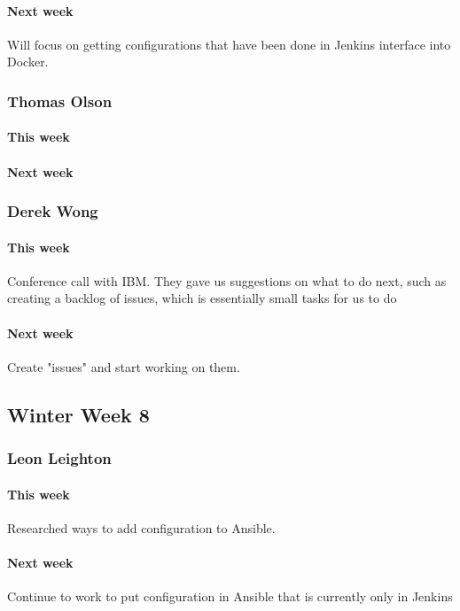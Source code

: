 \documentclass[10pt,letterpaper,onecolumn,draftclsnofoot]{IEEEtran}
\begin{document}
\paragraph{Next week}Will focus on getting configurations that have been done in Jenkins interface into Docker.


\subsubsection{Thomas Olson}
\paragraph{This week}
\paragraph{Next week}


\subsubsection{Derek Wong}
\paragraph{This week}Conference call with IBM. They gave us suggestions on what to do next, such as creating a backlog of issues, which is essentially small tasks for us to do
\paragraph{Next week}Create "issues" and start working on them.


\subsection{Winter Week 8}
\subsubsection{Leon Leighton}
\paragraph{This week}Researched ways to add configuration to Ansible.
\paragraph{Next week}Continue to work to put configuration in Ansible that is currently only in Jenkins
\end{document}
